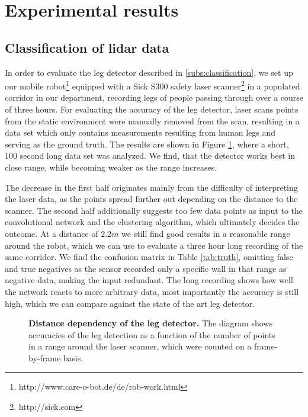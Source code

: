 \section{Experimental results}
\label{sec:Experiment}

\subsection{Classification of lidar data}

In order to evaluate the leg detector described in \ref{subs:classification}, we set up our mobile robot\footnote{http://www.care-o-bot.de/de/rob-work.html} equipped with a Sick S300 safety laser scanner\footnote{http://sick.com} in a populated corridor in our department, recording legs of people passing through over a course of three hours. 
For evaluating the accuracy of the leg detector, laser scans points from the static environment were manually removed from the scan, resulting in a data set which only contains measurements resulting from human legs and serving as the ground truth.
The results are shown in Figure \ref{fig:radius_detection}, where a short, 100 second long data set was analyzed.
We find, that the detector works best in close range, while becoming weaker as the range increases. 

The decrease in the first half originates mainly from the difficulty of interpreting the laser data, as the points spread further out depending on the distance to the scanner. The second half additionally suggests too few data points as input to the convolutional network and the clustering algorithm, which ultimately decides the outcome.
At a distance of $2.2 m$ we still find good results in a reasonable range around the robot, which we can use to evaluate a three hour long recording of the same corridor. We find the confusion matrix in Table \ref{tab:truth}, omitting false and true negatives as the sensor recorded only a specific wall in that range as negative data, making the input redundant. The long recording shows how well the network reacts to more arbitrary data, most importantly the accuracy is still high, which we can compare against the state of the art leg detector.

\begin{figure}[]
	\normalsize
	\begin{center}
		
	\end{center}
	\caption{\textbf{Distance dependency of the leg detector.} The diagram shows accuracies of the leg detection as a function of the number of points in a range around the laser scanner, which were counted on a frame-by-frame basis.}
	\label{fig:radius_detection}
\end{figure}

